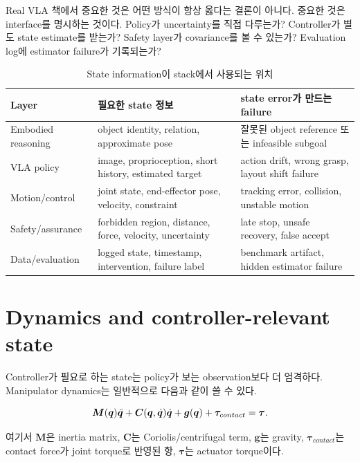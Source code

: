 Real VLA 책에서 중요한 것은 어떤 방식이 항상 옳다는 결론이 아니다. 중요한 것은 interface를 명시하는 것이다. Policy가 uncertainty를 직접 다루는가? Controller가 별도 state estimate를 받는가? Safety layer가 covariance를 볼 수 있는가? Evaluation log에 estimator failure가 기록되는가?

\begin{table}[ht]
\centering
\caption{State information이 stack에서 사용되는 위치}
\label{tab:state-stack}
\small
\begin{tabularx}{\textwidth}{p{30mm}X X}
\toprule
Layer & 필요한 state 정보 & state error가 만드는 failure \\
\midrule
Embodied reasoning & object identity, relation, approximate pose & 잘못된 object reference 또는 infeasible subgoal \\
VLA policy & image, proprioception, short history, estimated target & action drift, wrong grasp, layout shift failure \\
Motion/control & joint state, end-effector pose, velocity, constraint & tracking error, collision, unstable motion \\
Safety/assurance & forbidden region, distance, force, velocity, uncertainty & late stop, unsafe recovery, false accept \\
Data/evaluation & logged state, timestamp, intervention, failure label & benchmark artifact, hidden estimator failure \\
\bottomrule
\end{tabularx}
\end{table}

\section{Dynamics and controller-relevant state}

Controller가 필요로 하는 state는 policy가 보는 observation보다 더 엄격하다. Manipulator dynamics는 일반적으로 다음과 같이 쓸 수 있다.

\begin{equation}
  \bm{M}(\bm{q})\ddot{\bm{q}}
  + \bm{C}(\bm{q},\dot{\bm{q}})\dot{\bm{q}}
  + \bm{g}(\bm{q})
  + \bm{\tau}_{contact}
  = \bm{\tau}.
  \label{eq:manipulator-dynamics}
\end{equation}

여기서 $\bm{M}$은 inertia matrix, $\bm{C}$는 Coriolis/centrifugal term, $\bm{g}$는 gravity, $\bm{\tau}_{contact}$는 contact force가 joint torque로 반영된 항, $\bm{\tau}$는 actuator torque이다.

